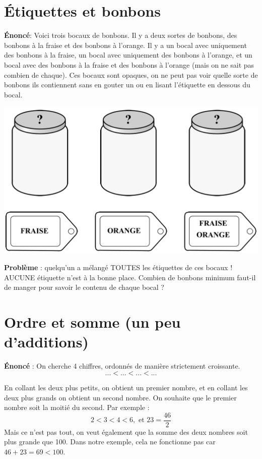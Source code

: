 \documentclass{article}
\begin{document}
\pagestyle{empty}



\section{Étiquettes et bonbons}

\textbf{Énoncé}: Voici trois bocaux de bonbons. Il y a deux sortes de bonbons, des bonbons à la fraise et des bonbons à l'orange. Il y a un bocal avec uniquement des bonbons à la fraise, un bocal avec uniquement des bonbons à l'orange, et un bocal avec des bonbons à la fraise et des bonbons à l'orange (mais on ne sait pas combien de chaque). Ces bocaux sont opaques, on ne peut pas voir quelle sorte de bonbons ils contiennent sans en gouter un ou en lisant l'étiquette en dessous du bocal. \\

\begin{center}
	\includegraphics[scale=0.45]{Figures/Etiquettes.png} 
\end{center}

\textbf{Problème }: quelqu'un a mélangé TOUTES les  étiquettes de ces bocaux ! AUCUNE  étiquette n’est à la bonne place. Combien de bonbons minimum faut-il de manger pour savoir le contenu de chaque bocal ? \\


   
   
\section{Ordre et somme  (un peu d'additions)}

\textbf{Énoncé} : On cherche 4 chiffres, ordonnés de manière strictement croissante. $$...<...<...<...$$

En collant les deux plus petits, on obtient un premier nombre, et en collant les deux plus grands on obtient un second nombre. On souhaite que le premier nombre soit la moitié du second.  Par exemple :
$$ 2<3<4<6,  \text{ et } 23 = \frac{46}{2}$$
Mais ce n'est pas tout, on veut également que la somme des deux nombres soit plus grande que 100. Dans notre exemple, cela ne fonctionne pas car
$ 46 + 23 = 69 < 100. $ \\
\end{document}
